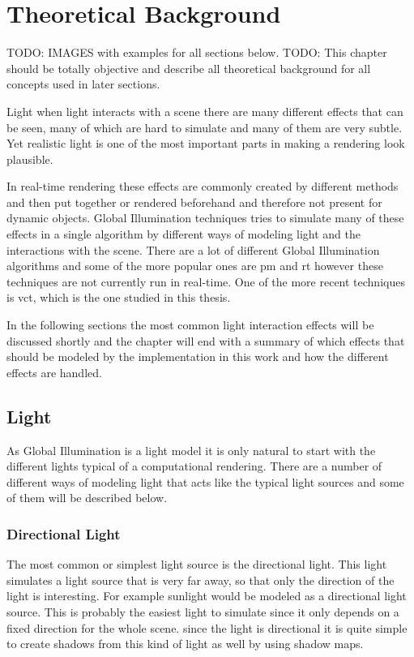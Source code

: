 \chapter{Theoretical Background}\label{cha:theory}

TODO: IMAGES with examples for all sections below.
TODO: This chapter should be totally objective and describe all theoretical background for all concepts used in later sections. 

Light when light interacts with a scene there are many different effects that can be seen, many of which are hard to simulate and many of them are very subtle. Yet realistic light is one of the most important parts in making a rendering look plausible. 

In real-time rendering these effects are commonly created by different methods and then put together or rendered beforehand and therefore not present for dynamic objects. Global Illumination techniques tries to simulate many of these effects in a single algorithm by different ways of modeling light and the interactions with the scene. There are a lot of different Global Illumination algorithms and some of the more popular ones are \gls{pm} and \gls{rt} however these techniques are not currently run in real-time. One of the more recent techniques is \gls{vct}, which is the one studied in this thesis.

In the following sections the most common light interaction effects will be discussed shortly and the chapter will end with a summary of which effects that should be modeled by the implementation in this work and how the different effects are handled.

\section{Light}

As Global Illumination is a light model it is only natural to start with the different lights typical of a computational rendering. There are a number of different ways of modeling light that acts like the typical light sources and some of them will be described below. 

\subsection{Directional Light}

The most common or simplest light source is the directional light. This light simulates a light source that is very far away, so that only the direction of the light is interesting. For example sunlight would be modeled as a directional light source. This is probably the easiest light to simulate since it only depends on a fixed direction for the whole scene. since the light is directional it is quite simple to create shadows from this kind of light as well by using shadow maps.

